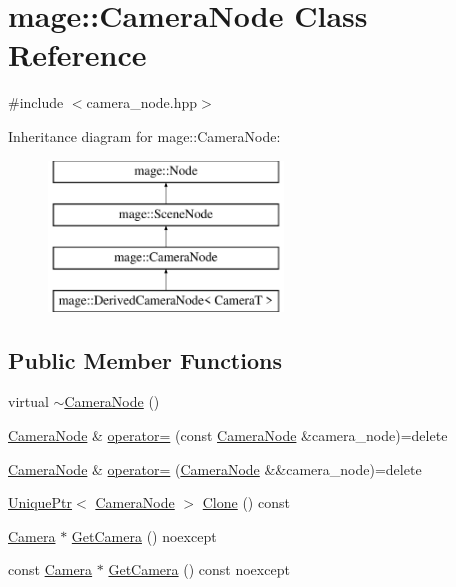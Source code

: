 \hypertarget{classmage_1_1_camera_node}{}\section{mage\+:\+:Camera\+Node Class Reference}
\label{classmage_1_1_camera_node}


{\ttfamily \#include $<$camera\+\_\+node.\+hpp$>$}

Inheritance diagram for mage\+:\+:Camera\+Node\+:\begin{figure}[H]
\begin{center}
\leavevmode
\includegraphics[height=4.000000cm]{classmage_1_1_camera_node}
\end{center}
\end{figure}
\subsection*{Public Member Functions}
\begin{DoxyCompactItemize}
\item 
virtual \hyperlink{classmage_1_1_camera_node_ac6612668e7b9f829e371794d422d357f}{$\sim$\+Camera\+Node} ()
\item 
\hyperlink{classmage_1_1_camera_node}{Camera\+Node} \& \hyperlink{classmage_1_1_camera_node_a03442d51e4279717f6692e0a731967a1}{operator=} (const \hyperlink{classmage_1_1_camera_node}{Camera\+Node} \&camera\+\_\+node)=delete
\item 
\hyperlink{classmage_1_1_camera_node}{Camera\+Node} \& \hyperlink{classmage_1_1_camera_node_a8da019549eeac6c4d7d6d7c4017dd498}{operator=} (\hyperlink{classmage_1_1_camera_node}{Camera\+Node} \&\&camera\+\_\+node)=delete
\item 
\hyperlink{namespacemage_a3316d7143a973e37adf1110f2e80ca31}{Unique\+Ptr}$<$ \hyperlink{classmage_1_1_camera_node}{Camera\+Node} $>$ \hyperlink{classmage_1_1_camera_node_a6c636830efadf9753f2f0d012153d61f}{Clone} () const
\item 
\hyperlink{classmage_1_1_camera}{Camera} $\ast$ \hyperlink{classmage_1_1_camera_node_aa9887e3bf192d6c078aae2430732cbf8}{Get\+Camera} () noexcept
\item 
const \hyperlink{classmage_1_1_camera}{Camera} $\ast$ \hyperlink{classmage_1_1_camera_node_aa911263cfce8cec2a42c6d03d25af606}{Get\+Camera} () const noexcept
\end{DoxyCompactItemize}
